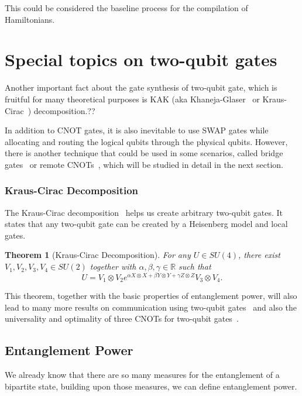 \documentclass{report}
\newtheorem{theorem}{Theorem}
\begin{document}
This could be considered the baseline process for the compilation of Hamiltonians.


\section{Special topics on two-qubit gates}

Another important fact about the gate synthesis of two-qubit gate, which is fruitful for many theoretical purposes is KAK (aka Khaneja-Glaser~\cite{khaneja2001} or Kraus-Cirac~\cite{kraus2001}) decomposition.??

In addition to CNOT gates, it is also inevitable to use SWAP gates while allocating and routing the logical qubits through the physical qubits. However, there is another technique that could be used in some scenarios, called bridge gates~\cite{sivarajah2021,itoko2019,shende2006,siraichi2018} or remote CNOTs~\cite{zhou2020, nash2020}, which will be studied in detail in the next section.


\subsubsection{Kraus-Cirac Decomposition}

The Kraus-Cirac decomposition~\cite{kraus2001} helps us create arbitrary two-qubit gates. It states that any two-qubit gate can be created by a Heisenberg model and local gates.

\begin{theorem}[Kraus-Cirac Decomposition]
For any $U \in SU(4)$, there exist $V_1, V_2, V_3, V_4 \in SU(2)$ together with $\alpha, \beta, \gamma \in \mathbb{R}$ such that
\begin{equation}
  U = V_1 \otimes V_2 e^{\alpha X\otimes X + \beta Y\otimes Y + \gamma Z\otimes Z} V_3 \otimes V_4.
  \end{equation}
\end{theorem}

This theorem, together with the basic properties of entanglement power, will also lead to many more results on communication using two-qubit gates~\cite{berry2002} and also the universality and optimality of three CNOTs for two-qubit gates~\cite{vatan2004}.


\subsection{Entanglement Power}

We already know that there are so many measures for the entanglement of a bipartite state, building upon those measures, we can define entanglement power.
\end{document}
